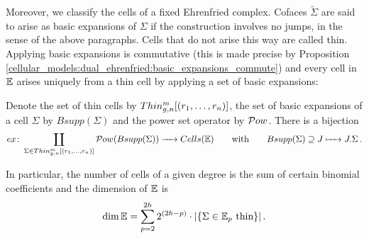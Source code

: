 Moreover, we classify the cells of a fixed Ehrenfried complex.
Cofaces $\tilde\Sigma$ are said to arise as basic expansions of $\Sigma$ if the construction involves no jumps, in the sense of the above paragraphs.
Cells that do not arise this way are called thin.
Applying basic expansions is commutative (this is made precise by Proposition \ref{cellular_models:dual_ehrenfried:basic_expansions_commute})
and every cell in $\mathbb E$ arises uniquely from a thin cell by applying a set of basic expansions:
\begin{prop*}[\ref{cellular_models:dual_ehrenfried:every_cell_is_an_expansion}]
    Denote the set of thin cells by $\Thin$, the set of basic expansions of a cell $\Sigma$ by $Bsupp(\Sigma)$ and the power set operator by $\mathcal{P}ow$.
    There is a bijection
    \[
        ex \colon \coprod_{\Sigma \in \Thin} \mc Pow( Bsupp(\Sigma)) \to Cells(\E) \mspc{with}{20} Bsupp(\Sigma) \supseteq J \mapsto J.\Sigma \,.
    \]
\end{prop*}
In particular, the number of cells of a given degree is the sum of certain binomial coefficients and the dimension of $\mathbb E$ is
\[
    \dim \mathbb E = \sum_{p=2}^{2h} 2^{(2h-p)} \cdot |\{\Sigma \in \mathbb E_p \text{ thin} \}| \,.
\]





